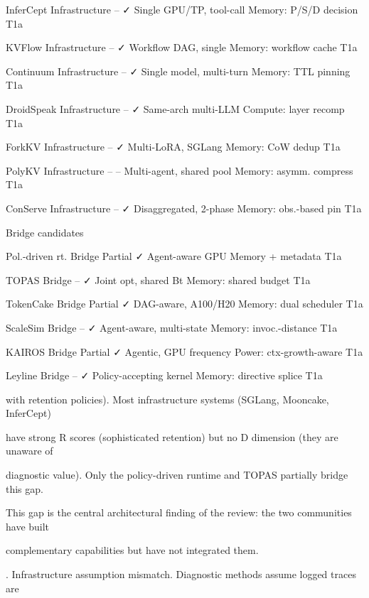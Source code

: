 \begin{flushleft}
\noindent  InferCept Infrastructure – ✓ Single GPU/TP, tool-call Memory: P/S/D decision T1a\par
\noindent  KVFlow Infrastructure – ✓ Workflow DAG, single Memory: workflow cache T1a\par
\noindent  Continuum Infrastructure – ✓ Single model, multi-turn Memory: TTL pinning T1a\par
\noindent  DroidSpeak Infrastructure – ✓ Same-arch multi-LLM Compute: layer recomp T1a\par
\noindent  ForkKV Infrastructure – ✓ Multi-LoRA, SGLang Memory: CoW dedup T1a\par
\noindent  PolyKV Infrastructure – – Multi-agent, shared pool Memory: asymm. compress T1a\par
\noindent  ConServe Infrastructure – ✓ Disaggregated, 2-phase Memory: obs.-based pin T1a\par
\noindent  Bridge candidates\par
\noindent  Pol.-driven rt. Bridge Partial ✓ Agent-aware GPU Memory + metadata T1a\par
\noindent  TOPAS Bridge – ✓ Joint opt, shared Bt Memory: shared budget T1a\par
\noindent  TokenCake Bridge Partial ✓ DAG-aware, A100/H20 Memory: dual scheduler T1a\par
\noindent  ScaleSim Bridge – ✓ Agent-aware, multi-state Memory: invoc.-distance T1a\par
\noindent  KAIROS Bridge Partial ✓ Agentic, GPU frequency Power: ctx-growth-aware T1a\par
\noindent  Leyline Bridge – ✓ Policy-accepting kernel Memory: directive splice T1a\par
\par\smallskip
\par\smallskip
\par\smallskip
\noindent  with retention policies). Most infrastructure systems (SGLang, Mooncake, InferCept)\par
\noindent  have strong R scores (sophisticated retention) but no D dimension (they are unaware of\par
\noindent  diagnostic value). Only the policy-driven runtime and TOPAS partially bridge this gap.\par
\noindent  This gap is the central architectural finding of the review: the two communities have built\par
\noindent  complementary capabilities but have not integrated them.\par
{}. Infrastructure assumption mismatch. Diagnostic methods assume logged traces are\par

\end{flushleft}
